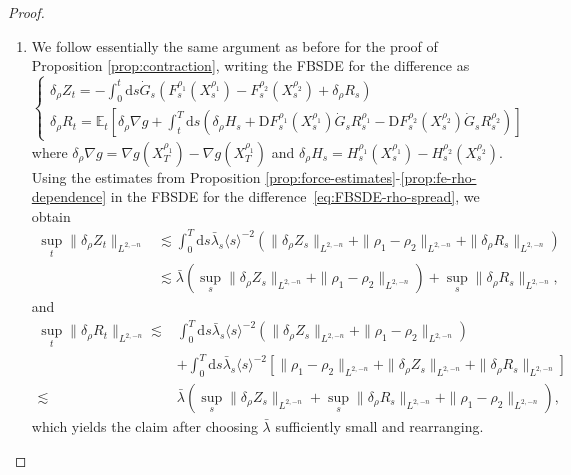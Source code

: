 \documentclass[11pt, a4paper]{scrartcl}
\numberwithin{equation}{section}
\theoremstyle{plain}
\theoremstyle{remark}
\newcommand{\mathD}{\mathrm{D}}
\newcommand{\mathd}{\mathrm{d}}
\newenvironment{enumeratealpha}{\begin{enumerate}[a{\textup{)}}] }{\end{enumerate}}
\begin{document}
\begin{proof}
  
  \begin{enumeratealpha}
    \item We follow essentially the same argument as before for the proof of
    Proposition \ref{prop:contraction}, writing the FBSDE for the difference
    as
    \begin{equation}
      \begin{cases}
        \delta_{\rho} Z_t = - \int_0^t \mathd s \dot{G}_s (F_s^{\rho_1}
        (X^{\rho_1}_s) - F_s^{\rho_2} (X_s^{\rho_2}) + \delta_{\rho} R_s)\\
        \delta_{\rho} R_t =\mathbb{E}_t \left[ \delta_{\rho} \nabla g +
        \int_t^T \mathd s \left(\delta_{\rho} H_s + \mathD
        F_s^{\rho_1} \left( X_s^{\rho_1} \right)  \dot{G}_s R_s^{\rho_1} -
        \mathD F_s^{\rho_2} (X_s^{\rho_2})  \dot{G}_s R_s^{\rho_2} \right)
        \right]
      \end{cases} \label{eq:FBSDE-rho-spread}
    \end{equation}
    where $\delta_{\rho} \nabla g = \nabla g (X^{\rho_1}_T) - \nabla g
    (X^{\rho_1}_T)$ and $\delta_{\rho} H_s = H_s^{\rho_1} (X^{\rho_1}_s) -
    H_s^{\rho_2} (X^{\rho_2}_s)$. Using the estimates from Proposition
    \ref{prop:force-estimates}-\ref{prop:fe-rho-dependence} in the FBSDE for
    the difference~\eqref{eq:FBSDE-rho-spread}, we obtain
    \[ \begin{aligned}
         \sup_t \| \delta_{\rho} Z_t \|_{L^{2, - n}} & \lesssim  \int_0^T
         \mathd s \bar{\lambda}_s \langle s \rangle^{- 2} (\| \delta_{\rho} Z_s
         \|_{L^{2, - n}} + \| \rho_1 - \rho_2 \|_{L^{2, - n}} + \|
         \delta_{\rho} R_s \|_{L^{2, - n}})\\
         & \lesssim  \bar{\lambda} (\sup_s \| \delta_{\rho} Z_s \|_{L^{2, - n}} +
         \| \rho_1 - \rho_2 \|_{L^{2, - n}}) + \sup_s \| \delta_{\rho} R_s
         \|_{L^{2, - n}},
       \end{aligned} \]
    and
    \[ \begin{aligned}
         \sup_t \| \delta_{\rho} R_t \|_{L^{2, - n}} \lesssim & \int_0^T
         \mathd s \bar{\lambda}_s \langle s \rangle^{- 2} (\| \delta_{\rho} Z_s
         \|_{L^{2, - n}} + \| \rho_1 - \rho_2 \|_{L^{2, - n}})\\
         & + \int_0^T \mathd s \bar{\lambda}_s \langle s \rangle^{- 2} [\|
         \rho_1 - \rho_2 \|_{L^{2, - n}} + \| \delta_{\rho} Z_s \|_{L^{2, -
         n}} + \| \delta_{\rho} R_s \|_{L^{2, - n}}]\\
         \lesssim & \bar{\lambda} (\sup_s \| \delta_{\rho} Z_s \|_{L^{2, - n}} +
         \sup_s \| \delta_{\rho} R_s \|_{L^{2, - n}} + \| \rho_1 - \rho_2
         \|_{L^{2, - n}}),
       \end{aligned} \]
    which yields the claim after choosing $\bar{\lambda}$ sufficiently small and
    rearranging.
    

\end{enumeratealpha}
\end{proof}
\end{document}
